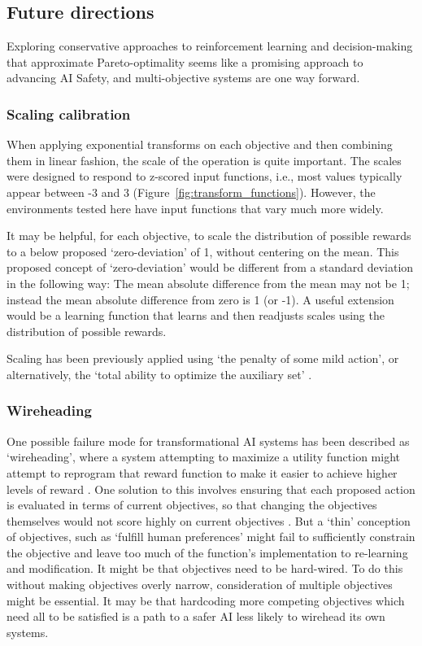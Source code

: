 \subsection{Future directions}

Exploring conservative approaches to reinforcement learning and decision-making that approximate Pareto-optimality seems like a promising approach to advancing AI Safety, and multi-objective systems are one way forward.%

\subsubsection{Scaling calibration}

When applying exponential transforms on each objective and then combining them in linear fashion, the scale of the operation is quite important. The scales were designed to respond to z-scored input functions, i.e., most values typically appear between -3 and 3 (Figure~\ref{fig:transform_functions}). However, the environments tested here have input functions that vary much more widely.

It may be helpful, for each objective, to scale the distribution of possible rewards to a below proposed `zero-deviation' of 1, without centering on the mean. This proposed concept of `zero-deviation' would be different from a standard deviation in the following way: The mean absolute difference from the mean may not be 1; instead the mean absolute difference from zero is 1 (or -1). A useful extension would be a learning function that learns and then readjusts scales using the distribution of possible rewards.

Scaling has been previously applied using `the penalty of some mild action', or alternatively, the `total ability to optimize the auxiliary set' %
\cite{turner_conservative_2020}.


\subsubsection{Wireheading}

One possible failure mode for  transformational AI systems has been described as `wireheading', where a system attempting to maximize a utility function might attempt to reprogram that reward function to make it easier to achieve higher levels of reward \cite{demski_a_stable_2017}. One solution to this involves ensuring that each proposed action is evaluated in terms of current objectives, so that changing the objectives themselves would not score highly on current objectives \cite{dewey_learning_2011}. But a `thin' conception of objectives, such as `fulfill human preferences' might fail to sufficiently constrain the objective and leave too much of the function's implementation to re-learning and modification. It might be that objectives need to be hard-wired. To do this without making objectives overly narrow, consideration of multiple objectives might be essential. It may be that hardcoding more competing objectives which need all to be satisfied is a path to a safer AI less likely to wirehead its own systems.


